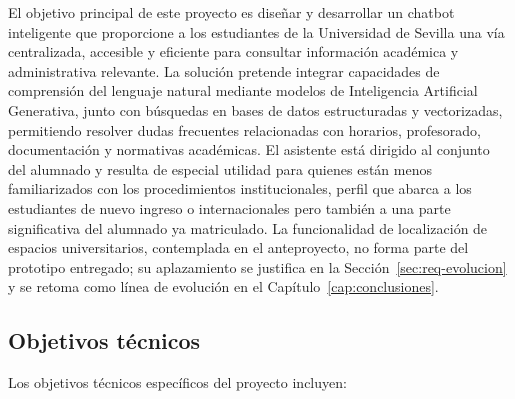 El objetivo principal de este proyecto es diseñar y desarrollar un chatbot inteligente que proporcione a los estudiantes de la Universidad de Sevilla una vía centralizada, accesible y eficiente para consultar información académica y administrativa relevante. La solución pretende integrar capacidades de comprensión del lenguaje natural mediante modelos de Inteligencia Artificial Generativa, junto con búsquedas en bases de datos estructuradas y vectorizadas, permitiendo resolver dudas frecuentes relacionadas con horarios, profesorado, documentación y normativas académicas. El asistente está dirigido al conjunto del alumnado y resulta de especial utilidad para quienes están menos familiarizados con los procedimientos institucionales, perfil que abarca a los estudiantes de nuevo ingreso o internacionales pero también a una parte significativa del alumnado ya matriculado. La funcionalidad de localización de espacios universitarios, contemplada en el anteproyecto, no forma parte del prototipo entregado; su aplazamiento se justifica en la Sección~\ref{sec:req-evolucion} y se retoma como línea de evolución en el Capítulo~\ref{cap:conclusiones}.

\subsection{Objetivos técnicos}
\label{subsec:objetivos-tecnicos}

Los objetivos técnicos específicos del proyecto incluyen:

